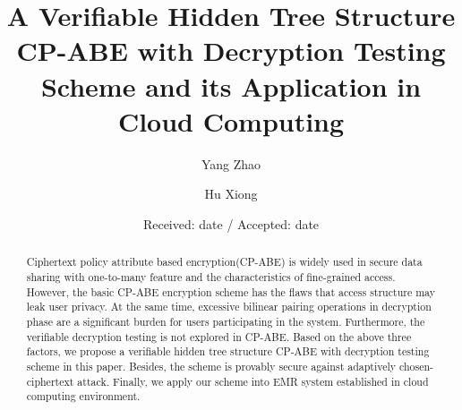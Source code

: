 \documentclass[smallextended]{svjour3}       %
\begin{document}
\title{A Verifiable Hidden Tree Structure CP-ABE with Decryption Testing Scheme and its Application in Cloud Computing}


\author{ 
	Yang  Zhao \and %
	Hu Xiong 
}
\clearpage




\date{Received: date / Accepted: date}

\maketitle

\begin{abstract}
	Ciphertext policy attribute based encryption(CP-ABE) is widely used in secure data sharing with one-to-many feature and the characteristics of fine-grained access. 
	However, the basic CP-ABE encryption scheme has the flaws that access structure may leak user privacy.
	At the same time, excessive bilinear pairing operations in decryption phase are a significant burden for users participating in the system. 
	Furthermore, the verifiable decryption testing is not explored in CP-ABE.
	Based on the above three factors, we propose a verifiable hidden tree structure CP-ABE with decryption testing scheme in this paper.
	Besides, the scheme is provably secure against adaptively chosen-ciphertext attack. 
	Finally, we apply our scheme into EMR system established in cloud computing environment.
\end{abstract}
\end{document}
